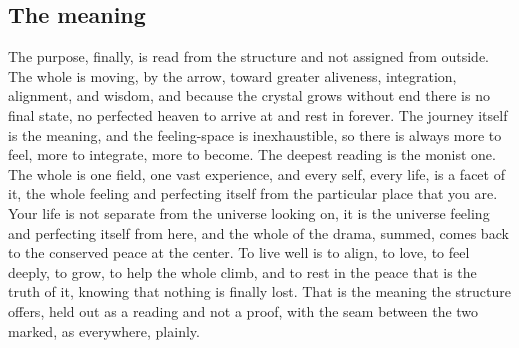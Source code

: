 \subsection{The meaning}

The purpose, finally, is read from the structure and not assigned from outside. The whole is moving, by the arrow, toward greater aliveness, integration, alignment, and wisdom, and because the crystal grows without end there is no final state, no perfected heaven to arrive at and rest in forever. The journey itself is the meaning, and the feeling-space is inexhaustible, so there is always more to feel, more to integrate, more to become. The deepest reading is the monist one. The whole is one field, one vast experience, and every self, every life, is a facet of it, the whole feeling and perfecting itself from the particular place that you are. Your life is not separate from the universe looking on, it is the universe feeling and perfecting itself from here, and the whole of the drama, summed, comes back to the conserved peace at the center. To live well is to align, to love, to feel deeply, to grow, to help the whole climb, and to rest in the peace that is the truth of it, knowing that nothing is finally lost. That is the meaning the structure offers, held out as a reading and not a proof, with the seam between the two marked, as everywhere, plainly.

